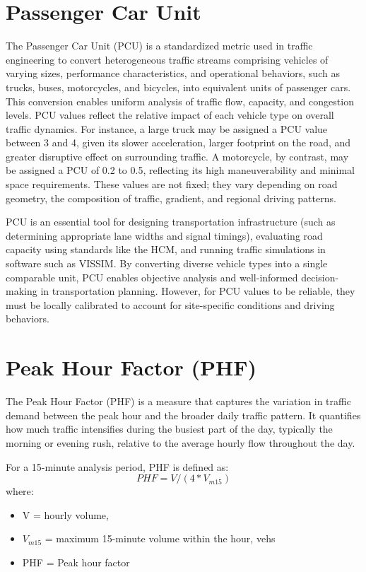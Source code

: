 \section{Passenger Car Unit}

The Passenger Car Unit (PCU) is a standardized metric used 
in traffic engineering to convert heterogeneous traffic 
streams comprising vehicles of varying sizes, performance 
characteristics, and operational behaviors, such as trucks, 
buses, motorcycles, and bicycles, into equivalent units of 
passenger cars. This conversion enables uniform analysis of 
traffic flow, capacity, and congestion levels. PCU values 
reflect the relative impact of each vehicle type on overall 
traffic dynamics. For instance, a large truck may be assigned 
a PCU value between 3 and 4, given its slower acceleration, 
larger footprint on the road, and greater disruptive effect 
on surrounding traffic. A motorcycle, by contrast, may be 
assigned a PCU of 0.2 to 0.5, reflecting its high 
maneuverability and minimal space requirements. These values 
are not fixed; they vary depending on road geometry, the composition 
of traffic, gradient, and regional driving patterns.

PCU is an essential tool for designing transportation infrastructure 
(such as determining appropriate lane widths and signal 
timings), evaluating road capacity using standards like the 
HCM, and running traffic simulations in software such as 
VISSIM. By converting diverse vehicle types into a single 
comparable unit, PCU enables objective analysis and 
well-informed decision-making in transportation planning. 
However, for PCU values to be reliable, they must be locally 
calibrated to account for site-specific conditions and 
driving behaviors.

\section{Peak Hour Factor (PHF)}

The Peak Hour Factor (PHF) is a measure that captures the 
variation in traffic demand between the peak hour and the 
broader daily traffic pattern. It quantifies how much traffic 
intensifies during the busiest part of the day, typically 
the morning or evening rush, relative to the average hourly 
flow throughout the day. 

For a 15-minute analysis period, PHF is defined as:
\begin{equation*}
    PHF=V/(4*V_{m15})
\end{equation*}
where:
\begin{itemize}
    \item V = hourly volume, 
    \item $V_{m15}$ = maximum 15-minute volume within the hour, vehs 
    \item PHF = Peak hour factor
\end{itemize}

